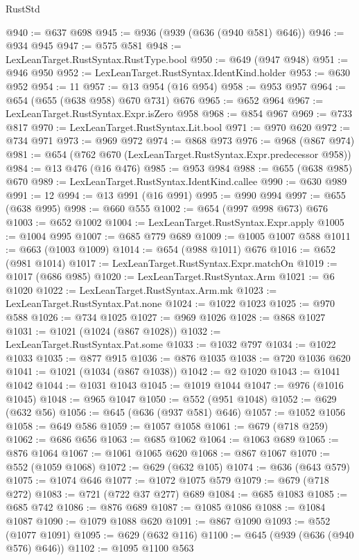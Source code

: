 \begin{lexlean}{RustStd}
\begin{coremodule}
@940 := @637 @698
@945 := @936 (@939 (@636 (@940 @581) @646))
@946 := @934 @945
@947 := @575 @581
@948 := LexLeanTarget.RustSyntax.RustType.bool
@950 := @649 (@947 @948)
@951 := @946 @950
@952 := LexLeanTarget.RustSyntax.IdentKind.holder
@953 := @630 @952
@954 := 11
@957 := @13 @954 (@16 @954)
@958 := @953 @957
@964 := @654 (@655 (@638 @958) @670 @731) @676
@965 := @652 @964
@967 := LexLeanTarget.RustSyntax.Expr.isZero @958
@968 := @854 @967
@969 := @733 @817
@970 := LexLeanTarget.RustSyntax.Lit.bool
@971 := @970 @620
@972 := @734 @971
@973 := @969 @972
@974 := @868 @973
@976 := @968 (@867 @974)
@981 := @654 (@762 @670 (LexLeanTarget.RustSyntax.Expr.predecessor @958))
@984 := @13 @476 (@16 @476)
@985 := @953 @984
@988 := @655 (@638 @985) @670
@989 := LexLeanTarget.RustSyntax.IdentKind.callee
@990 := @630 @989
@991 := 12
@994 := @13 @991 (@16 @991)
@995 := @990 @994
@997 := @655 (@638 @995)
@998 := @660 @555
@1002 := @654 (@997 @998 @673) @676
@1003 := @652 @1002
@1004 := LexLeanTarget.RustSyntax.Expr.apply
@1005 := @1004 @995
@1007 := @685 @779 @689
@1009 := @1005 @1007 @588
@1011 := @663 (@1003 @1009)
@1014 := @654 (@988 @1011) @676
@1016 := @652 (@981 @1014)
@1017 := LexLeanTarget.RustSyntax.Expr.matchOn
@1019 := @1017 (@686 @985)
@1020 := LexLeanTarget.RustSyntax.Arm
@1021 := @6 @1020
@1022 := LexLeanTarget.RustSyntax.Arm.mk
@1023 := LexLeanTarget.RustSyntax.Pat.none
@1024 := @1022 @1023
@1025 := @970 @588
@1026 := @734 @1025
@1027 := @969 @1026
@1028 := @868 @1027
@1031 := @1021 (@1024 (@867 @1028))
@1032 := LexLeanTarget.RustSyntax.Pat.some
@1033 := @1032 @797
@1034 := @1022 @1033
@1035 := @877 @915
@1036 := @876 @1035
@1038 := @720 @1036 @620
@1041 := @1021 (@1034 (@867 @1038))
@1042 := @2 @1020
@1043 := @1041 @1042
@1044 := @1031 @1043
@1045 := @1019 @1044
@1047 := @976 (@1016 @1045)
@1048 := @965 @1047
@1050 := @552 (@951 @1048)
@1052 := @629 (@632 @56)
@1056 := @645 (@636 (@937 @581) @646)
@1057 := @1052 @1056
@1058 := @649 @586
@1059 := @1057 @1058
@1061 := @679 (@718 @259)
@1062 := @686 @656
@1063 := @685 @1062
@1064 := @1063 @689
@1065 := @876 @1064
@1067 := @1061 @1065 @620
@1068 := @867 @1067
@1070 := @552 (@1059 @1068)
@1072 := @629 (@632 @105)
@1074 := @636 (@643 @579)
@1075 := @1074 @646
@1077 := @1072 @1075 @579
@1079 := @679 (@718 @272)
@1083 := @721 (@722 @37 @277) @689
@1084 := @685 @1083
@1085 := @685 @742
@1086 := @876 @689
@1087 := @1085 @1086
@1088 := @1084 @1087
@1090 := @1079 @1088 @620
@1091 := @867 @1090
@1093 := @552 (@1077 @1091)
@1095 := @629 (@632 @116)
@1100 := @645 (@939 (@636 (@940 @576) @646))
@1102 := @1095 @1100 @563

\end{coremodule}
\end{lexlean}
